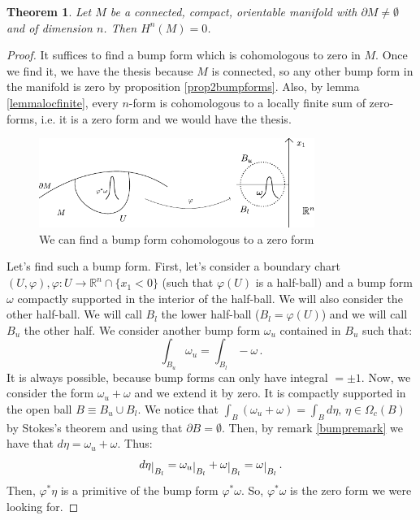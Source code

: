 \documentclass[a4paper,11pt,titlepage, article, oneside]{memoir}
\numberwithin{equation}{section}
\newtheorem{theorem}{Theorem}[section]
\theoremstyle{definition}
\theoremstyle{remark}
\newcommand{\rfield}{\mathbb{R}}
\newcommand{\restrict}[2]{{#1}\raisebox{-.5ex}{$|$}_{#2}}
\begin{document}
\begin{theorem}
Let $M$ be a connected, compact, orientable manifold with $\partial M \not = \emptyset$ and of dimension $n$. Then $H^n(M) = 0$.
\end{theorem}
\begin{proof}
It suffices to find a bump form which is cohomologous to zero in $M$. Once we find it, we have the thesis because $M$ is connected, so any other bump form in the manifold is zero by proposition \ref{prop2bumpforms}. Also, by lemma \ref{lemmalocfinite}, every $n$-form is cohomologous to a locally finite sum of zero-forms, i.e. it is a zero form and we would have the thesis.
\begin{figure}[H] \label{Fig:bumpforms2}
     \centering
     \includegraphics[width=0.8\textwidth]{Images/bumpforms2.pdf} 
     \caption{We can find a bump form cohomologous to a zero form}      
\end{figure}
Let's find such a bump form. First, let's consider a boundary chart $(U, \varphi), \varphi \colon U \rightarrow \rfield^n \cap \{x_1 < 0\}$ (such that $\varphi(U)$ is a half-ball) and a bump form $\omega$ compactly supported in the interior of the half-ball. We will also consider the other half-ball. We will call $B_l$ the lower half-ball ($B_l = \varphi(U)$) and we will call $B_u$ the other half. We consider another bump form $\omega_u$ contained in $B_u$ such that:
\[ \int_{B_u} \omega_u = \int_{B_l} - \omega \, . \]
It is always possible, because bump forms can only have integral $=\pm 1$.
Now, we consider the form $\omega_u + \omega$ and we extend it by zero. It is compactly supported in the open ball $B \equiv B_u \cup B_l$. We notice that $\int_{B} (\omega_u + \omega) = \int_B d\eta, \, \eta \in \Omega_c(B)$ by Stokes's theorem and using that $\partial B =\emptyset$. Then, by remark \ref{bumpremark} we have that $d\eta = \omega_u + \omega$. Thus:
\[ \restrict{d\eta}{B_l} = \restrict{\omega_u}{B_l} + \restrict{\omega}{B_l} = \restrict{\omega}{B_l} \, . \]
Then, $\varphi^* \eta$ is a primitive of the bump form $\varphi^* \omega$. So, $\varphi^* \omega$ is the zero form we were looking for.
\end{proof}
\end{document}
